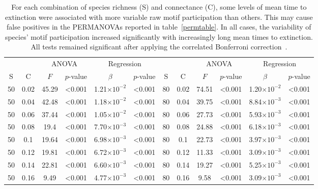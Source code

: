 \documentclass[12pt]{article}
\begin{document}
\begin{spacing}{2.0}
		\begin{table}[h!]
			\caption{For each combination of species richness (S) and connectance (C), some levels of mean time to extinction were associated with more variable raw motif participation than others. This may cause false positives in the PERMANOVAs reported in table~\ref{permtable}. In all cases, the variability of species' motif participation increased significantly with increasingly long mean times to extinction. All tests remained significant after applying the correlated Bonferroni correction~\citep{Drezner2016}.}
			\label{betadisp_count}
			\footnotesize
			\begin{tabular}{c c | c c| c c ||c c | c c | c c |}
				&		&	\multicolumn{2}{c|}{ANOVA}	&\multicolumn{2}{c||}{Regression} 			& & & 	\multicolumn{2}{c|}{ANOVA}		 	&	 \multicolumn{2}{c|}{Regression} 			\\
	            S	&	C	&	$F$	&	$p$-value	&	$\beta$	&	$p$-value	&	S	&	C	&	$F$	&	$p$-value	&	$\beta$	&	$p$-value	\\
				\hline
                50  & 0.02  & 45.29 & \textless0.001 & 1.21$\times10^{-2}$ & \textless0.001 & 80  & 0.02  & 74.51 & \textless0.001 & 1.20$\times10^{-2}$ & \textless0.001 \\
                50  & 0.04  & 42.48 & \textless0.001 & 1.18$\times10^{-2}$ & \textless0.001 & 80  & 0.04  & 39.75 & \textless0.001 & 8.84$\times10^{-3}$ & \textless0.001 \\
                50  & 0.06  & 37.44 & \textless0.001 & 1.05$\times10^{-2}$ & \textless0.001 & 80  & 0.06  & 27.73 & \textless0.001 & 5.93$\times10^{-3}$ & \textless0.001 \\
                50  & 0.08  & 19.4  & \textless0.001 & 7.70$\times10^{-3}$ & \textless0.001 & 80  & 0.08  & 24.88 & \textless0.001 & 6.18$\times10^{-3}$ & \textless0.001 \\
                50  & 0.1 & 19.64 & \textless0.001 & 6.98$\times10^{-3}$ & \textless0.001 & 80  & 0.1 & 22.73 & \textless0.001 & 3.97$\times10^{-3}$ & \textless0.001 \\
                50  & 0.12  & 19.81 & \textless0.001 & 6.72$\times10^{-3}$ & \textless0.001 & 80  & 0.12  & 11.33 & \textless0.001 & 3.09$\times10^{-3}$ & \textless0.001 \\
                50  & 0.14  & 22.81 & \textless0.001 & 6.60$\times10^{-3}$ & \textless0.001 & 80  & 0.14  & 19.27 & \textless0.001 & 5.25$\times10^{-3}$ & \textless0.001 \\
                50  & 0.16  & 9.49  & \textless0.001 & 4.77$\times10^{-3}$ & \textless0.001 & 80  & 0.16  & 9.58  & \textless0.001 & 3.09$\times10^{-3}$ & \textless0.001 \\

\end{tabular}
\end{table}
\end{spacing}
\end{document}
